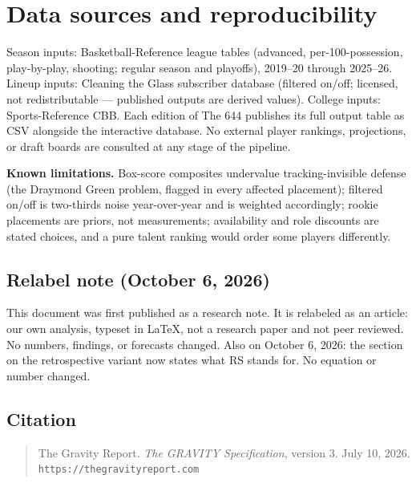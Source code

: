\documentclass[11pt]{article}
\begin{document}
\section{Data sources and reproducibility}

Season inputs: Basketball-Reference league tables (advanced, per-100-possession,
play-by-play, shooting; regular season and playoffs), 2019--20 through 2025--26. Lineup
inputs: Cleaning the Glass subscriber database (filtered on/off; licensed, not
redistributable --- published outputs are derived values). College inputs:
Sports-Reference CBB. Each edition of The 644 publishes its full output table as CSV
alongside the interactive database. No external player rankings, projections, or draft
boards are consulted at any stage of the pipeline.

\textbf{Known limitations.} Box-score composites undervalue tracking-invisible defense
(the Draymond Green problem, flagged in every affected placement); filtered on/off is
two-thirds noise year-over-year and is weighted accordingly; rookie placements are
priors, not measurements; availability and role discounts are stated choices, and a pure
talent ranking would order some players differently.

\subsection*{Relabel note (October 6, 2026)}
This document was first published as a research note. It is relabeled as an article: our own
analysis, typeset in \LaTeX, not a research paper and not peer reviewed. No numbers, findings, or
forecasts changed.
Also on October 6, 2026: the section on the retrospective variant now states what RS stands for.
No equation or number changed.

\subsection*{Citation}
\begin{quote}
The Gravity Report. \emph{The GRAVITY Specification}, version 3. July 10, 2026.\\
\texttt{https://thegravityreport.com}
\end{quote}
\end{document}
